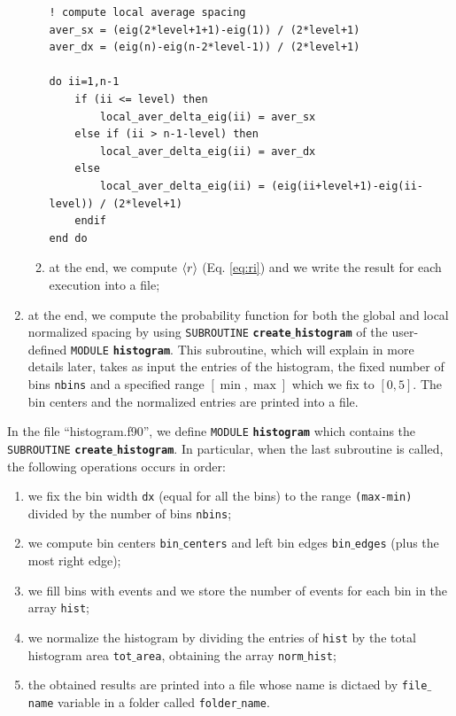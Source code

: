 \documentclass[rmp,10pt,onecolumn,fleqn,notitlepage]{revtex4-1}
\begin{document}
\begin{enumerate}
\begin{enumerate}
    \begin{minipage}[t]{0.85\linewidth}%
    \begin{lstlisting}[style=Fortran]
! compute local average spacing
aver_sx = (eig(2*level+1+1)-eig(1)) / (2*level+1)
aver_dx = (eig(n)-eig(n-2*level-1)) / (2*level+1)

do ii=1,n-1
    if (ii <= level) then
        local_aver_delta_eig(ii) = aver_sx
    else if (ii > n-1-level) then
        local_aver_delta_eig(ii) = aver_dx
    else
        local_aver_delta_eig(ii) = (eig(ii+level+1)-eig(ii-level)) / (2*level+1)
    endif
end do\end{lstlisting}
    \end{minipage}

    \item at the end, we compute \( \expval{r}  \) (Eq. \eqref{eq:ri}) and we write the result for each execution into a file;
    \end{enumerate}

\item at the end, we compute the probability function for both the global and local normalized spacing by using \texttt{SUBROUTINE} {\bfseries\texttt{create$\_$histogram}} of the user-defined \texttt{MODULE} {\bfseries\texttt{histogram}}. This subroutine, which will explain in more details later, takes as input the entries of the histogram, the fixed number of bins \texttt{nbins} and a specified range \( [\min,\max] \) which we fix to \( [0,5] \). The bin centers and the normalized entries are printed into a file.

\end{enumerate}

In the file “histogram.f90”, we define \texttt{MODULE} {\bfseries\texttt{histogram}} which contains the \texttt{SUBROUTINE} {\bfseries\texttt{create$\_$histogram}}. In particular, when the last subroutine is called, the following operations occurs in order:
\begin{enumerate}
\item we fix the bin width \texttt{dx} (equal for all the bins) to the range \texttt{(max-min)} divided by the number of bins \texttt{nbins};
\item we compute bin centers \texttt{bin$\_$centers} and left bin edges \texttt{bin$\_$edges} (plus the most right edge);
\item we fill bins with events and we store the number of events for each bin in the array \texttt{hist};
\item we normalize the histogram by dividing the entries of \texttt{hist} by the total histogram area \texttt{tot$\_$area}, obtaining the array \texttt{norm$\_$hist};
\item the obtained results are printed into a file whose name is dictaed by \texttt{file$\_$name} variable in a folder called \texttt{folder$\_$name}.
\end{enumerate}
\end{document}
